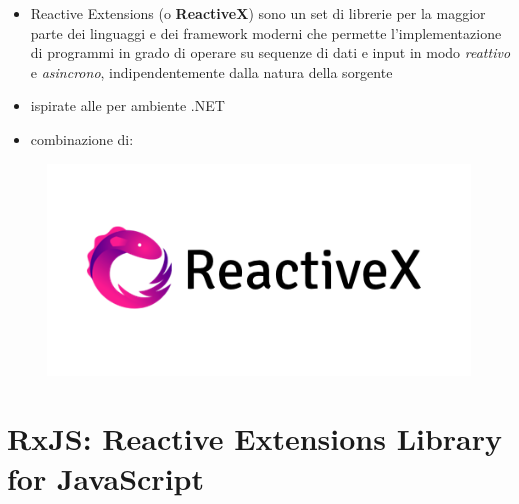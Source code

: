         \begin{frame}{\insertsectionhead}
            \begin{block}{\insertsubsectionhead}
                \begin{itemize}
                    \item
                        Reactive Extensions (o \textbf{ReactiveX}) sono un set di librerie per la maggior parte dei linguaggi e dei framework moderni che permette l'implementazione di programmi in grado di operare su sequenze di dati e input in modo \textit{reattivo} e \textit{asincrono}, indipendentemente dalla natura della sorgente
                    \item
                        ispirate alle  per ambiente .NET
                    \item
                        combinazione di:
                \end{itemize}
            \end{block}
            \begin{figure}[htbp]
                \centering
                \includegraphics[scale=.35]{Rx_Logo_Text}
                \label{fig:rx}
            \end{figure}
        \end{frame}

    \section{RxJS: Reactive Extensions Library for JavaScript}\label{sec:rxjs}

